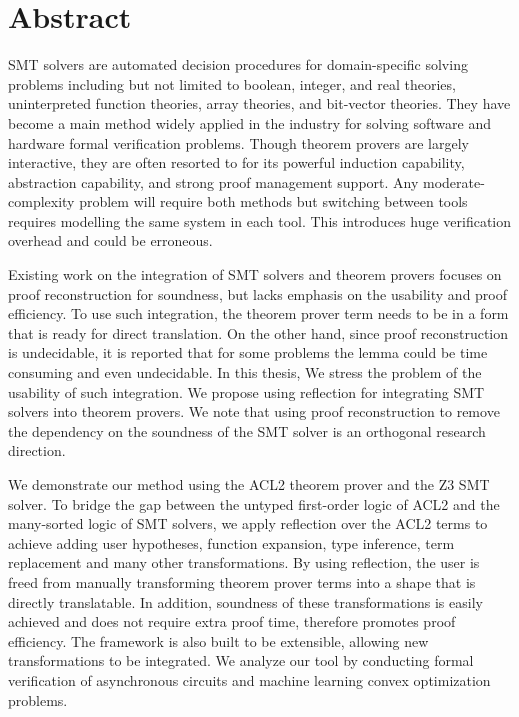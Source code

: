 
\chapter{Abstract}

SMT solvers are automated decision procedures for domain-specific solving
problems including but not limited to boolean, integer, and real theories,
uninterpreted function theories, array theories, and bit-vector theories.
They have become a main method widely applied in the industry for solving
software and hardware formal verification problems.
Though theorem provers are largely interactive, they are often resorted to for
its powerful induction capability, abstraction capability, and strong proof
management support.
Any moderate-complexity problem will require both methods but switching between
tools requires modelling the same system in each tool.
This introduces huge verification overhead and could be erroneous.

Existing work on the integration of SMT solvers and theorem provers focuses on
proof reconstruction for soundness, but lacks emphasis on the usability and
proof efficiency.
To use such integration, the theorem prover term needs to be in a form that is
ready for direct translation.
On the other hand, since proof reconstruction is undecidable, it is reported
that for some problems the lemma could be time consuming and even undecidable.
In this thesis, We stress the problem of the usability of such integration.
We propose using reflection for integrating SMT solvers into theorem provers.
We note that using proof reconstruction to remove the dependency on the
soundness of the SMT solver is an orthogonal research direction.

We demonstrate our method using the ACL2 theorem prover and the Z3 SMT solver.
To bridge the gap between the untyped first-order logic of ACL2 and the
many-sorted logic of SMT solvers, we apply reflection over the ACL2 terms to
achieve adding user hypotheses, function expansion, type inference, term
replacement and many other transformations.
By using reflection, the user is freed from manually transforming theorem prover
terms into a shape that is directly translatable.
In addition, soundness of these transformations is easily achieved and does not
require extra proof time, therefore promotes proof efficiency.
The framework is also built to be extensible, allowing new transformations to be
integrated.
We analyze our tool by conducting formal verification of asynchronous circuits
and machine learning convex optimization problems.

